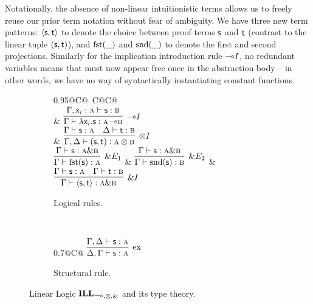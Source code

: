 Notationally, the absence of non-linear intuitionistic terms allows us to freely reuse our prior term notation without fear of ambiguity.
We have three new term patterns: $\langle \mathsf{s}, \mathsf{t} \rangle$ to denote the choice between proof terms $\mathsf{s}$ and $\mathsf{t}$ (contrast to the linear tuple $(\mathsf{s}, \mathsf{t})$), and $\textrm{fst}(\_)$ and $\textrm{snd}(\_)$ to denote the first and second projections.
Similarly for the implication introduction rule $\li I$, no redundant variables means that \smallterm{\vari } must now appear free once in the abstraction body  -- in other words, we have no way of syntactically instantiating constant functions.

\begin{figure}
	\centering
	\begin{subfigure}{1\textwidth}
		\centering
		\begin{tabularx}{0.95\textwidth}{@{}C@{~}C@{\qquad}C@{}}
		\\[2em]
		& 
		$\infer[\li I]{\Gamma \vdash \term{\lam \vari .s}: \prop{a} \li \prop{b}}{\Gamma, \term{\vari }: \prop{a} \vdash \term{s}: \prop{b}}$\\[\smallsep]
		&
		$\infer[\otimes I]{\Gamma, \Delta \vdash (\term{s}, \term{t}): \prop{a} \otimes \prop{b}}{\Gamma \vdash \term{s}: \prop{a} & \Delta \vdash \term{t}: \prop{b}}$\\[\smallsep]
		$
		\infer[\with E_1]{\Gamma \vdash \cterm{fst(\smallterm{s})}: \prop{a}}{\Gamma \vdash \smallterm{s}: \prop{a} \with \prop{b}}
		$
		&
		$
		\infer[\with E_2]{\Gamma \vdash \cterm{snd(\smallterm{s})}: \prop{b}}{\Gamma \vdash \term{s}: \prop{a} \with \prop{b}}
		$
		&
		$
		\infer[\with I]{\Gamma \vdash \langle\term{s}, \term{t}\rangle: \prop{a} \with \prop{b}}{\Gamma \vdash \term{s}: \prop{a} & \Gamma \vdash \term{t}: \prop{b}}
		$
		\end{tabularx}
		\caption{Logical rules.}
		\label{subfigure:linear_logic_rules:logical}
	\end{subfigure}\\[\midsep]
	\begin{subfigure}{1\textwidth}
		\centering
		\begin{tabularx}{0.7\textwidth}{@{}C@{}}
		$
		\infer[\Exchange{}]{\Delta, \Gamma \vdash \term{s}: \prop{a}}{\Gamma, \Delta \vdash \term{s}:  \prop{a}}
		$
		\end{tabularx}
		\caption{Structural rule.}
		\label{subfigure:linear_logic_rules:structural}
	\end{subfigure}
	\caption{Linear Logic $\ILL_{\li,\otimes,\with}$ and its type theory.}
	\label{figure:linear_logic_rules}
\end{figure}

